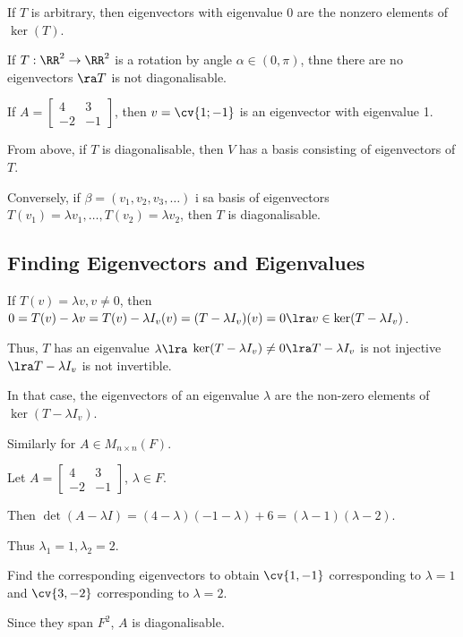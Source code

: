 \documentclass[11pt]{scrartcl}
\begin{document}
\begin{example}
  If \(T\) is arbitrary, then eigenvectors with eigenvalue 0 are the nonzero elements of \(\ker(T)\).
\end{example}
\begin{example}
  If \(T: \RR^{2} \to \RR^{2}\) is a rotation by angle
  \(\alpha\in (0, \pi)\), thne there are no eigenvectors \(\ra T\) is
  not diagonalisable.
\end{example}
\begin{example}
  If \(A = \begin{bmatrix}
    4 & 3\\
    -2 & -1
  \end{bmatrix}\), then \(v=\cv{1; -1}\) is an eigenvector with eigenvalue 1.
\end{example}

From above, if \(T\) is diagonalisable, then \(V\) has a basis consisting of eigenvectors of \(T\).

Conversely, if \(\beta = (v_{1}, v_{2}, v_{3}, \dots)\) i sa basis of
eigenvectors
\(T(v_{1}) = \lambda v_{1}, \dots, T(v_{2}) = \lambda v_{2}\), then
\(T\) is diagonalisable.

\subsection{Finding Eigenvectors and Eigenvalues}
\label{subsec:eigf}

If \(T(v)= \lambda v, v\neq 0\), then
\(0 = T(v) - \lambda v = T(v) - \lambda I_{v}(v) = (T-\lambda
I_{v})(v) = 0 \lra v\in \ker(T-\lambda I_{v})\).

Thus, \(T\) has an eigenvalue \(\lambda \lra\)
\(\ker(T-\lambda I_{v}) \neq 0 \lra T-\lambda I_{v}\) is not injective
\(\lra T- \lambda I_{v}\) is not invertible.

In that case, the eigenvectors of an eigenvalue \(\lambda\) are the
non-zero elements of \(\ker(T-\lambda I_{v})\).

Similarly for \(A\in M_{n\times n}(F)\).

\begin{example}
  Let \(A = \begin{bmatrix}
    4 & 3\\
    -2 & -1
  \end{bmatrix}\), \(\lambda \in F\).

  Then
  \(\det(A-\lambda I) = (4 - \lambda)(-1-\lambda) + 6 =
  (\lambda-1)(\lambda - 2)\).

  Thus \(\lambda_{1} = 1, \lambda_{2} = 2\).

  Find the corresponding eigenvectors to obtain \(\cv{1, -1}\)
  corresponding to \(\lambda = 1\) and \(\cv{3, -2}\) corresponding to
  \(\lambda = 2\).

  Since they span \(F^{2}\), \(A\) is diagonalisable.
\end{example}
\end{document}
